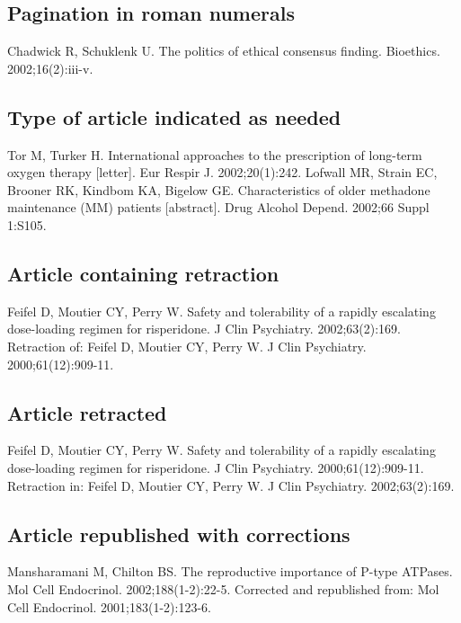 \documentclass[a4paper,10pt]{article}
\begin{document}
\subsection{Pagination in roman numerals}

Chadwick R, Schuklenk U. The politics of ethical consensus finding. Bioethics. 2002;16(2):iii-v.\cite{chadwick.schuklenk:politics}

\subsection{Type of article indicated as needed}

Tor M, Turker H. International approaches to the prescription of long-term oxygen therapy [letter]. Eur Respir J. 2002;20(1):242.\cite{tor.turker:international}
\linebreak
Lofwall MR, Strain EC, Brooner RK, Kindbom KA, Bigelow GE. Characteristics of older methadone maintenance (MM) patients [abstract]. Drug Alcohol Depend. 2002;66 Suppl 1:S105.\cite{lofwall.strain.ea:characteristics}

\subsection{Article containing retraction}

Feifel D, Moutier CY, Perry W. Safety and tolerability of a rapidly escalating dose-loading regimen for risperidone. J Clin Psychiatry. 2002;63(2):169. Retraction of: Feifel D, Moutier CY, Perry W. J Clin Psychiatry. 2000;61(12):909-11.\cite{feifel.moutier.ea:safety}

\subsection{Article retracted}

Feifel D, Moutier CY, Perry W. Safety and tolerability of a rapidly escalating dose-loading regimen for risperidone. J Clin Psychiatry. 2000;61(12):909-11. Retraction in: Feifel D, Moutier CY, Perry W. J Clin Psychiatry. 2002;63(2):169.\cite{feifel.moutier.ea:safety*1}

\subsection{Article republished with corrections}

Mansharamani M, Chilton BS. The reproductive importance of P-type ATPases. Mol Cell Endocrinol. 2002;188(1-2):22-5. Corrected and republished from: Mol Cell Endocrinol. 2001;183(1-2):123-6.\cite{mansharamani.chilton:reproductive}
\end{document}
